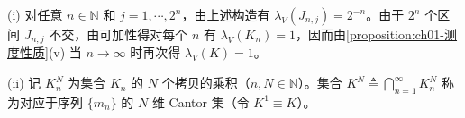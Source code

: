 \documentclass[../../main.tex]{subfiles}%
\begin{document}
\begin{remark}\label{remark:ch01-Cantor-Vitali}
(i) 对任意 $n\in\mathbb{N}$ 和 $j=1,\cdots ,2^n$，由上述构造有 $\lambda_V(J_{n,j})=2^{-n}$。由于 $2^n$ 个区间 $J_{n,j}$ 不交，由可加性得对每个 $n$ 有 $\lambda_V(K_n)=1$，因而由\cref{proposition:ch01-测度性质}(v) 当 $n\to\infty$ 时再次得 $\lambda_V(K)=1$。

(ii) 记 $K_n^N$ 为集合 $K_n$ 的 $N$ 个拷贝的乘积（$n,N\in\mathbb{N}$）。集合 $K^N\triangleq\bigcap_{n=1}^\infty K_n^N$ 称为对应于序列 $\{m_n\}$ 的 $N$ 维 Cantor 集（令 $K^1\equiv K$）。
\end{remark}
\end{document}
